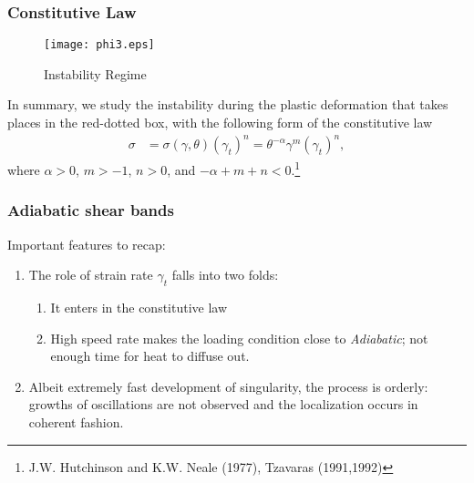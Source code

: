 \documentclass{beamer}
\def\red{\color{red}}
\begin{document}
\begin{frame}
 \frametitle{Constitutive Law}
 \begin{figure}
    \centering
    \center
    \texttt{[image: phi3.eps]} 
    \vskip -15pt
     \caption{Instability Regime}
    \end{figure} 
 \vskip -5pt
 In summary, we study the instability during the plastic deformation that takes places in the red-dotted box, with the following form of the constitutive law
 \begin{align}
  \sigma &= \sigma(\gamma,\theta)(\gamma_t)^n=\theta^{-\alpha}\gamma^m(\gamma_t)^n, 
 \end{align}%
 where $\alpha>0$, $m>-1$, $n>0$, and {\red $-\alpha +m+n<0$}.\footnote[frame]{J.W. Hutchinson and K.W. Neale (1977), Tzavaras (1991,1992)}
\end{frame}


\begin{frame}
 \frametitle{Adiabatic shear bands}
 Important features to recap:%
 \vfill
 \begin{enumerate}
  \item The role of strain rate $\gamma_t$ falls into two folds:
  \begin{enumerate}
   \item It enters in the constitutive law%
   \item High speed rate makes the loading condition close to {\it Adiabatic}; not enough time for heat to diffuse out.
  \end{enumerate}
  \item Albeit extremely fast development of singularity, the process is orderly: growths of oscillations are not observed and the localization occurs in {\red coherent} fashion.
 \end{enumerate}
 \vfill
\end{frame}
\end{document}
